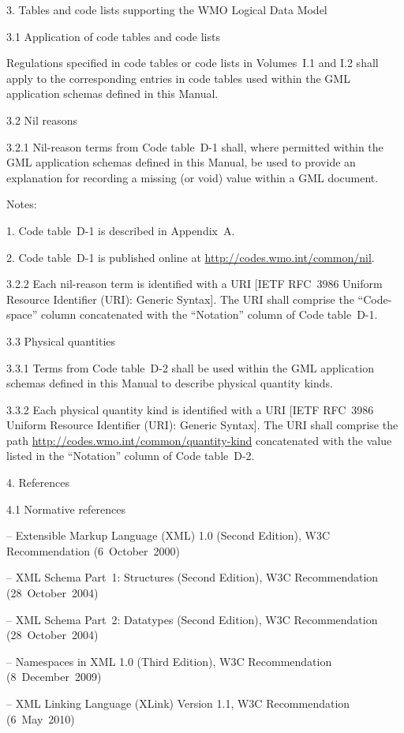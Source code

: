 3. Tables and code lists supporting the WMO Logical Data Model

3.1 Application of code tables and code lists

Regulations specified in code tables or code lists in Volumes~I.1 and I.2 shall apply to the corresponding entries in code tables used within the GML application schemas defined in this Manual.

3.2 Nil reasons

3.2.1 Nil-reason terms from Code table~D-1 shall, where permitted within the GML application schemas defined in this Manual, be used to provide an explanation for recording a missing (or void) value within a GML document.

Notes:

1. Code table~D-1 is described in Appendix~A.

2. Code table~D-1 is published online at \url{http://codes.wmo.int/common/nil}.

3.2.2 Each nil-reason term is identified with a URI {[}IETF RFC~3986 Uniform Resource Identifier (URI): Generic Syntax{]}. The URI shall comprise the ``Code-space'' column concatenated with the ``Notation'' column of Code table~D-1.

3.3 Physical quantities

3.3.1 Terms from Code table~D-2 shall be used within the GML application schemas defined in this Manual to describe physical quantity kinds.

3.3.2 Each physical quantity kind is identified with a URI {[}IETF RFC~3986 Uniform Resource Identifier (URI): Generic Syntax{]}. The URI shall comprise the path \url{http://codes.wmo.int/common/quantity-kind} concatenated with the value listed in the ``Notation'' column of Code table~D-2.

4. References

4.1 Normative references

-- Extensible Markup Language (XML) 1.0 (Second Edition), W3C Recommendation (6~October~2000)

-- XML Schema Part~1: Structures (Second Edition), W3C Recommendation (28~October~2004)

-- XML Schema Part~2: Datatypes (Second Edition), W3C Recommendation (28~October~2004)

-- Namespaces in XML 1.0 (Third Edition), W3C Recommendation (8~December~2009)

-- XML Linking Language (XLink) Version 1.1, W3C Recommendation (6~May~2010)

